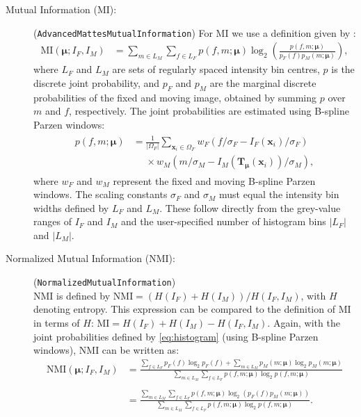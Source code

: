 \documentclass[]{report}
\newcommand{\vx}{\bm{x}}
\newcommand{\vmu}{\bm{\mu}}
\newcommand{\vTm}{\bm{T}_{\vmu}}
\newcommand\relphantom[1]{\mathrel{\phantom{#1}}}
\begin{document}
\begin{description}
\item[Mutual Information (MI):] (\texttt{AdvancedMattesMutualInformation})
For MI \citep{MaesEA97,ViolaEA97,MattesEA03} we use a definition
given by \citet{ThevenazEA00a}:
\begin{align}
\mathrm{MI}(\vmu; I_F, I_M) &=
 \sum\limits_{m\in L_M} \sum\limits_{f\in L_F}
 p(f,m;\vmu) \log_2
 \left( \frac{ p(f,m;\vmu) }{ p_F(f) p_M(m;\vmu)  }
 \right),\label{eq:MI}
\end{align}
where $L_F$ and $L_M$ are sets of regularly spaced intensity bin
centres, $p$ is the discrete joint probability, and $p_F$ and
$p_M$ are the marginal discrete probabilities of the fixed and
moving image, obtained by summing $p$ over $m$ and $f$,
respectively. The joint probabilities are estimated using B-spline
Parzen windows:
\begin{align}
\begin{split}
 p(f,m;\vmu) &=  \frac{1}{|\Omega_F|} \sum\limits_{\vx_i \in \Omega_F}
 w_F( f/\sigma_F - I_F(\vx_i)/\sigma_F ) \\
 &\relphantom{=}\times w_M( m/\sigma_M - I_M(\vTm(\vx_i))/\sigma_M ),
\end{split} \label{eq:histogram}
\end{align}
where $w_F$ and $w_M$ represent the fixed and moving B-spline
Parzen windows. The scaling constants $\sigma_F$ and $\sigma_M$
must equal the intensity bin widths defined by $L_F$ and $L_M$.
These follow directly from the grey-value ranges of $I_F$ and
$I_M$ and the user-specified number of histogram bins $|L_F|$ and
$|L_M|$.

\item[Normalized Mutual Information (NMI):]
(\texttt{NormalizedMutualInformation})\\ NMI is defined by
$\mathrm{NMI} = ( H(I_F) + H(I_M) ) / H(I_F,I_M)$, with $H$
denoting entropy. This expression can be compared to the
definition of MI in terms of $H$: $\mathrm{MI} = H(I_F) + H(I_M) -
H(I_F,I_M)$. Again, with the joint probabilities defined by
\ref{eq:histogram} (using B-spline Parzen windows), NMI can be
written as:
\begin{align}
\mathrm{NMI}(\vmu; I_F, I_M) &=
 \frac{\sum\limits_{f\in L_F} p_F(f)
 \log_2 p_F(f) + \sum\limits_{m\in L_M} p_M(m;\vmu) \log_2 p_M(m;\vmu)}
 { \sum\limits_{m\in L_M} \sum\limits_{f\in L_F}
 p(f,m;\vmu) \log_2 p(f,m;\vmu)} \nonumber \\ \nonumber \\
 &= \frac{\sum\limits_{m\in L_M} \sum\limits_{f\in L_F} p(f,m;\vmu) \log_2
 \left( p_F(f) p_M(m;\vmu) \right)}{ \sum\limits_{m\in L_M} \sum\limits_{f\in L_F}
 p(f,m;\vmu) \log_2 p(f,m;\vmu) }. \label{eq:NMI}
\end{align}


\end{description}
\end{document}
